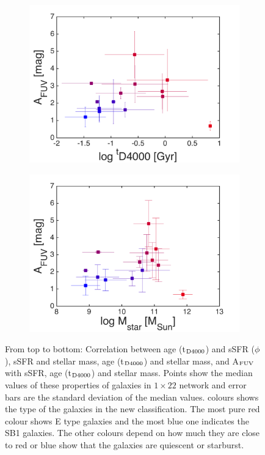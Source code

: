 \begin{figure}
\begin{subfigure}[b]{0.3\textwidth}
            \includegraphics[width=\textwidth]{images0.01/1d/f5.png}
        \end{subfigure}
       \hfill
        \begin{subfigure}[b]{0.3\textwidth}
            \includegraphics[width=\textwidth]{images0.01/1d/f6.png}
        \end{subfigure}
        \caption[Relations between properties of the clustered galaxies]{From top to bottom: Correlation between age (t$_{\rm {D4000}}$) and sSFR ($\phi$), sSFR and stellar mass, age (t$_{\rm {D4000}}$) and stellar mass, and A$_{\rm {FUV}}$ with sSFR, age (t$_{\rm {D4000}}$) and stellar mass. Points show the median values of these properties of galaxies in $1\times22$ network and error bars are the standard deviation of the median values. colours shows the type of the galaxies in the new classification. The most pure red colour shows E type galaxies and the most blue one indicates the SB1 galaxies. The other colours depend on how much they are close to red or blue show that the galaxies are quiescent or starburst.}
        \label{fig: props_vs_props}
    \end{figure}
        
